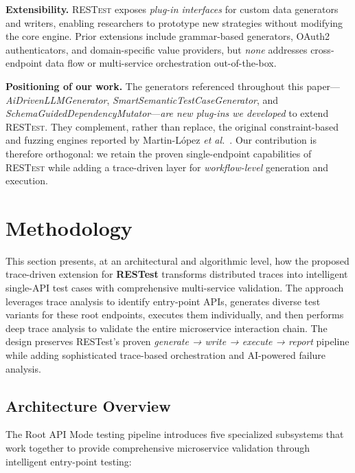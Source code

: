 \documentclass[conference]{IEEEtran}
\begin{document}
\textbf{Extensibility.}  
\textsc{RESTest} exposes \emph{plug-in interfaces} for custom data
generators and writers, enabling researchers to prototype new
strategies without modifying the core engine.  
Prior extensions include grammar-based generators, OAuth2
authenticators, and domain-specific value providers, but \emph{none}
addresses cross-endpoint data flow or multi-service orchestration
out-of-the-box.

\textbf{Positioning of our work.}  
The generators referenced throughout this paper—
\textit{AiDrivenLLMGenerator}, \textit{SmartSemanticTestCaseGenerator},
and \textit{SchemaGuidedDependencyMutator}—\emph{are new plug-ins we
developed} to extend \textsc{RESTest}.  
They complement, rather than replace, the original
constraint-based and fuzzing engines reported by
Martin-López \emph{et al.}~\cite{martin2019restest}.  
Our contribution is therefore orthogonal: we retain the proven
single-endpoint capabilities of \textsc{RESTest} while adding a
trace-driven layer for \emph{workflow-level} generation and execution.


\section{Methodology}\label{sec:method}
This section presents, at an architectural and algorithmic level, how the proposed trace-driven extension for \textbf{RESTest} transforms distributed traces into intelligent single-API test cases with comprehensive multi-service validation.  The approach leverages trace analysis to identify entry-point APIs, generates diverse test variants for these root endpoints, executes them individually, and then performs deep trace analysis to validate the entire microservice interaction chain.  The design preserves RESTest's proven \textit{generate → write → execute → report} pipeline while adding sophisticated trace-based orchestration and AI-powered failure analysis.

\subsection{Architecture Overview}\label{ssec:arch}
The Root API Mode testing pipeline introduces five specialized subsystems that work together to provide comprehensive microservice validation through intelligent entry-point testing:
\end{document}
